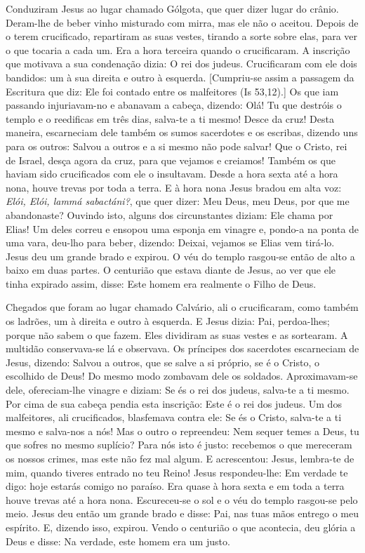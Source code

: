\documentclass{rosario}
\begin{document}

Conduziram Jesus ao lugar chamado Gólgota, que quer dizer lugar do crânio.
Deram-lhe de beber vinho misturado com mirra, mas ele não o aceitou.
Depois de o terem crucificado, repartiram as suas vestes, tirando a sorte sobre elas, para ver o que tocaria a cada um.
Era a hora terceira quando o crucificaram.
A inscrição que motivava a sua condenação dizia: O rei dos judeus.
Crucificaram com ele dois bandidos: um à sua direita e outro à esquerda.
[Cumpriu-se assim a passagem da Escritura que diz: Ele foi contado entre os malfeitores (Is 53,12).]
Os que iam passando injuriavam-no e abanavam a cabeça, dizendo:
Olá! Tu que destróis o templo e o reedificas em três dias,
salva-te a ti mesmo! Desce da cruz!
Desta maneira, escarneciam dele também os sumos sacerdotes e os escribas, dizendo uns para os outros:
Salvou a outros e a si mesmo não pode salvar!
Que o Cristo, rei de Israel, desça agora da cruz, para que vejamos e creiamos!
Também os que haviam sido crucificados com ele o insultavam.
Desde a hora sexta até a hora nona, houve trevas por toda a terra.
E à hora nona Jesus bradou em alta voz:
\emph{Elói, Elói, lammá sabactáni?}, que quer dizer: Meu Deus, meu Deus, por que me abandonaste?
Ouvindo isto, alguns dos circunstantes diziam: Ele chama por Elias!
Um deles correu e ensopou uma esponja em vinagre e, pondo-a na ponta de uma vara, deu-lho para beber, dizendo:
Deixai, vejamos se Elias vem tirá-lo.
Jesus deu um grande brado e expirou.
O véu do templo rasgou-se então de alto a baixo em duas partes.
O centurião que estava diante de Jesus, ao ver que ele tinha expirado assim, disse:
Este homem era realmente o Filho de Deus.


Chegados que foram ao lugar chamado Calvário, ali o crucificaram, como também os ladrões, um à direita e outro à esquerda.
E Jesus dizia:
Pai, perdoa-lhes;
porque não sabem o que fazem.
Eles dividiram as suas vestes e as sortearam.
A multidão conservava-se lá e observava.
Os príncipes dos sacerdotes escarneciam de Jesus, dizendo:
Salvou a outros, que se salve a si próprio, se é o Cristo, o escolhido de Deus!
Do mesmo modo zombavam dele os soldados.
Aproximavam-se dele, ofereciam-lhe vinagre e diziam:
Se és o rei dos judeus, salva-te a ti mesmo.
Por cima de sua cabeça pendia esta inscrição:
Este é o rei dos judeus.
Um dos malfeitores, ali crucificados, blasfemava contra ele:
Se és o Cristo, salva-te a ti mesmo e salva-nos a nós!
Mas o outro o repreendeu:
Nem sequer temes a Deus, tu que sofres no mesmo suplício?
Para nós isto é justo:
recebemos o que mereceram os nossos crimes, mas este não fez mal algum.
E acrescentou:
Jesus, lembra-te de mim, quando tiveres entrado no teu Reino!
Jesus respondeu-lhe:
Em verdade te digo:
hoje estarás comigo no paraíso.
Era quase à hora sexta e em toda a terra houve trevas até a hora nona.
Escureceu-se o sol e o véu do templo rasgou-se pelo meio.
Jesus deu então um grande brado e disse:
Pai, nas tuas mãos entrego o meu espírito.
E, dizendo isso, expirou.
Vendo o centurião o que acontecia, deu glória a Deus e disse:
Na verdade, este homem era um justo.
\end{document}
